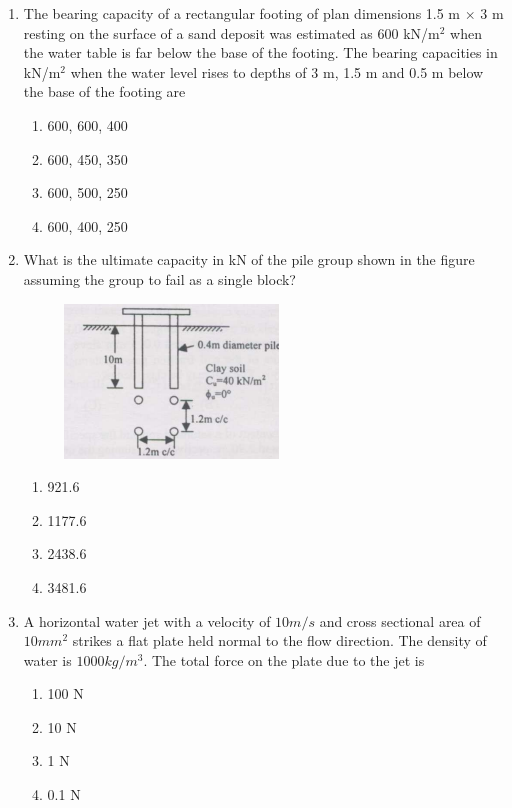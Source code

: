 \documentclass[journal,12pt,onecolumn]{IEEEtran}
\theoremstyle{remark}
\begin{document}
\begin{enumerate}
\item The bearing capacity of a rectangular footing of plan dimensions 1.5 m $\times$ 3 m resting on the surface of a sand deposit was estimated as 600 kN/m$^2$ when the water table is far below the base of the footing. The bearing capacities in kN/m$^2$ when the water level rises to depths of 3 m, 1.5 m and 0.5 m below the base of the footing are

\hfill{}
\begin{enumerate}
\item 600, 600, 400
\item 600, 450, 350
\item 600, 500, 250
\item 600, 400, 250
\end{enumerate}

\item What is the ultimate capacity in kN of the pile group shown in the figure assuming the group to fail as a single block?

\hfill{}
\begin{figure}[H]
\centering
\includegraphics[width=0.3\columnwidth]{figs/q49.png}
\caption*{}
\label{fig:Q.49}
\end{figure}
\begin{enumerate}
\item 921.6
\item 1177.6
\item 2438.6
\item 3481.6
\end{enumerate}

\item A horizontal water jet with a velocity of $10 m/s$ and cross sectional area of $10 mm^2$ strikes a flat plate held normal to the flow direction. The density of water is $1000 kg/m^3$. The total force on the plate due to the jet is

\hfill{}
\begin{enumerate}
\item 100 N
\item 10 N
\item 1 N
\item 0.1 N
\end{enumerate}


\end{enumerate}
\end{document}
